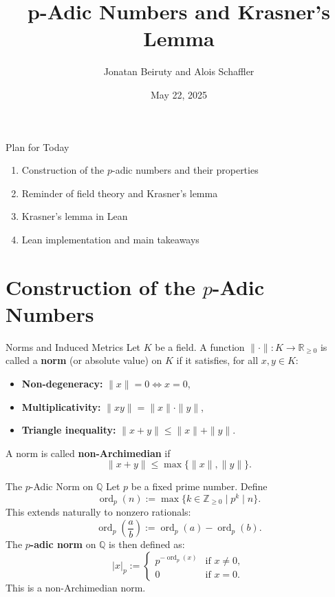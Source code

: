 \documentclass{beamer}
\title{p-Adic Numbers and Krasner's Lemma}
\author{Jonatan Beiruty and Alois Schaffler}
\date{May 22, 2025}
\begin{document}
\maketitle
\begin{frame}{Plan for Today}

\begin{enumerate}
    \item Construction of the \(p\)-adic numbers and their properties
    \item Reminder of field theory and Krasner's lemma
    \item Krasner's lemma in Lean
    \item Lean implementation and main takeaways
\end{enumerate}

\end{frame}



\section{Construction of the \(p\)-Adic Numbers}
\begin{frame}{Norms and Induced Metrics} 
Let $K$ be a field. A function $\|\cdot\| : K \to \mathbb{R}_{\geq 0}$ is called a \textbf{norm} (or absolute value) on $K$ if it satisfies, for all $x, y \in K$:
\begin{itemize}
    \item \textbf{Non-degeneracy:} $\|x\| = 0 \iff x = 0$,
    \item \textbf{Multiplicativity:} $\|xy\| = \|x\| \cdot \|y\|$,
    \item \textbf{Triangle inequality:} $\|x + y\| \leq \|x\| + \|y\|$.
\end{itemize}
\pause 
A norm is called \textbf{non-Archimedian} if 
\begin{equation*}
    \|x + y\| \leq \max\{\|x\|, \|y\|\}.
\end{equation*}
\end{frame}

\begin{frame}{The $p$-Adic Norm on $\mathbb{Q}$}
Let $p$ be a fixed prime number. Define
\[
\operatorname{ord}_p(n) := \max\{k \in \mathbb{Z}_{\geq 0} \mid p^k \mid n \}.
\]
\pause
This extends naturally to nonzero rationals:
\[
\operatorname{ord}_p\left(\frac{a}{b}\right) := \operatorname{ord}_p(a) - \operatorname{ord}_p(b).
\]
\pause
The \textbf{$p$-adic norm} on $\mathbb{Q}$ is then defined as:
\[
|x|_p := 
\begin{cases}
p^{-\operatorname{ord}_p(x)} & \text{if } x \neq 0, \\
0 & \text{if } x = 0.
\end{cases}
\]
This is a non-Archimedian norm.
\end{frame}
\end{document}
